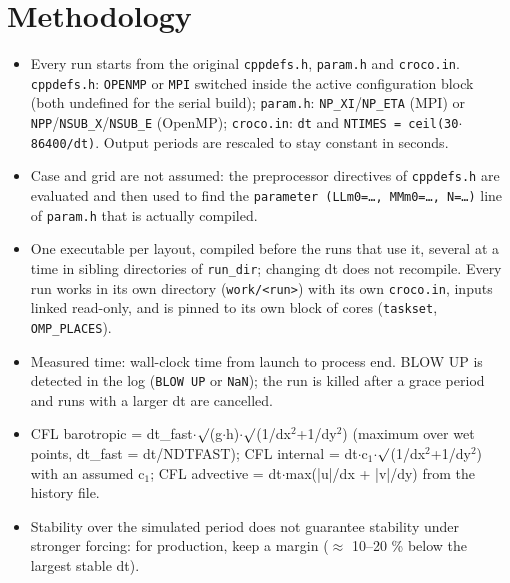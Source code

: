 \documentclass[10pt,a4paper]{article}
\begin{document}
\section{Methodology}
\begin{itemize}
\item Every run starts from the original \texttt{cppdefs.h}, \texttt{param.h} and \texttt{croco.in}. \texttt{cppdefs.h}: \texttt{OPENMP} or \texttt{MPI} switched inside the active configuration block (both undefined for the serial build); \texttt{param.h}: \texttt{NP\_XI}/\texttt{NP\_ETA} (MPI) or \texttt{NPP}/\texttt{NSUB\_X}/\texttt{NSUB\_E} (OpenMP); \texttt{croco.in}: \texttt{dt} and \texttt{NTIMES = ceil(30$\cdot$86400/dt)}. Output periods are rescaled to stay constant in seconds.
\item Case and grid are not assumed: the preprocessor directives of \texttt{cppdefs.h} are evaluated and then used to find the \texttt{parameter (LLm0=\ldots{}, MMm0=\ldots{}, N=\ldots{})} line of \texttt{param.h} that is actually compiled.
\item One executable per layout, compiled before the runs that use it, several at a time in sibling directories of \texttt{run\_dir}; changing dt does not recompile. Every run works in its own directory (\texttt{work/<run>}) with its own \texttt{croco.in}, inputs linked read-only, and is pinned to its own block of cores (\texttt{taskset}, \texttt{OMP\_PLACES}).
\item Measured time: wall-clock time from launch to process end. BLOW UP is detected in the log (\texttt{BLOW UP} or \texttt{NaN}); the run is killed after a grace period and runs with a larger dt are cancelled.
\item CFL barotropic = dt\_fast$\cdot$$\surd$(g$\cdot$h)$\cdot$$\surd$(1/dx$^2$+1/dy$^2$) (maximum over wet points, dt\_fast = dt/NDTFAST); CFL internal = dt$\cdot$c$_1$$\cdot$$\surd$(1/dx$^2$+1/dy$^2$) with an assumed c$_1$; CFL advective = dt$\cdot$max(|u|/dx + |v|/dy) from the history file.
\item Stability over the simulated period does not guarantee stability under stronger forcing: for production, keep a margin ($\approx$ 10--20 \% below the largest stable dt).
\end{itemize}
\end{document}
